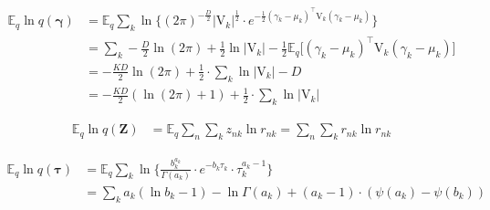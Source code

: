 \documentclass[twoside,11pt]{article}
\newcommand{\transpose}[1]{#1^{\intercal}}
\newcommand{\nsum}{\sum\limits_{n}}
\newcommand{\ksum}{\sum\limits_{k}}
\newcommand{\boldgamma}{\boldsymbol\gamma}
\newcommand{\boldtau}{\boldsymbol\tau}
\newcommand{\E}{\mathbb{E}}
\begin{document}
\begin{align*}
	\E_q \ln q\left( \boldgamma \right) &= \E_q \ksum \ln \Big\{ (2\pi)^{-\frac{D}{2}} |\mathrm{V}_k|^{\frac{1}{2}} \cdot e^{-\frac{1}{2} \transpose{(\gamma_k	- \mu_k)} \mathrm{V}_k (\gamma_k - \mu_k)}\Big\}\\
	&= \ksum -\frac{D}{2} \ln (2\pi) + \frac{1}{2} \ln |\mathrm{V}_k|  -\frac{1}{2} \E_q \Big[ \transpose{(\gamma_k - \mu_k)} \mathrm{V}_k (\gamma_k- \mu_k)\Big] \\
	&= -\frac{KD}{2} \ln (2\pi) + \frac{1}{2} \cdot \ksum \ln |\mathrm{V}_k| - D \\
	&= - \frac{KD}{2} \left( \ln(2\pi) + 1 \right) + \frac{1}{2} \cdot \ksum \ln |\mathrm{V}_k|
\end{align*}

\begin{align*}
	\E_q \ln q\left( \mathbf{Z} \right) &= \E_q \nsum \ksum z_{nk} \ln r_{nk} = \nsum \ksum r_{nk} \ln r_{nk}
\end{align*}

\begin{align*}
	\E_q \ln q\left( \boldtau \right) &= \E_q \ksum \ln \Bigg\{ \frac{b_k^{a_k}}{\Gamma(a_k)} \cdot  e^{-b_k \tau_k} \cdot  \tau_k^{a_k - 1}\Bigg\}\\
	&= \ksum a_k \left( \ln b_k - 1 \right) - \ln \Gamma(a_k)  + (a_k - 1) \cdot \left( \psi(a_k) - \psi(b_k) \right)
\end{align*}



\vskip 0.2in
\printbibliography
\end{document}
